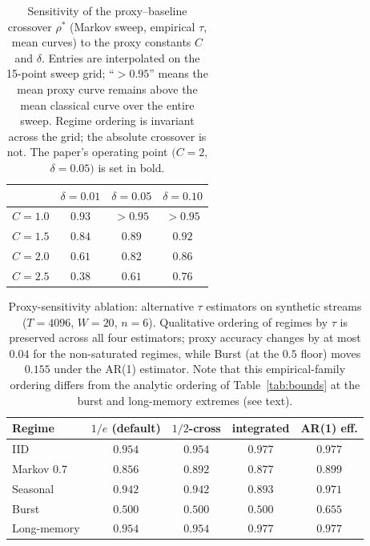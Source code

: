 \documentclass[sensors,article,submit,pdftex,moreauthors]{Definitions/mdpi}
\begin{document}
\begin{table}[t]
\centering
\caption{Sensitivity of the proxy--baseline crossover $\rho^{*}$ (Markov sweep, empirical $\tau$, mean curves) to the proxy constants $C$ and $\delta$. Entries are interpolated on the 15-point sweep grid; ``$>0.95$'' means the mean proxy curve remains above the mean classical curve over the entire sweep. Regime ordering is invariant across the grid; the absolute crossover is not. The paper's operating point $(C = 2$, $\delta = 0.05)$ is set in bold.}
\label{tab:cdelta}
\begin{tabular}{@{}lccc@{}}
\toprule
 & $\delta = 0.01$ & $\delta = 0.05$ & $\delta = 0.10$ \\
\midrule
$C = 1.0$ & $0.93$ & $>0.95$ & $>0.95$ \\
$C = 1.5$ & $0.84$ & $0.89$ & $0.92$ \\
$C = 2.0$ & $0.61$ & $\mathbf{0.82}$ & $0.86$ \\
$C = 2.5$ & $0.38$ & $0.61$ & $0.76$ \\
\bottomrule
\end{tabular}
\end{table}

\begin{table}[t]
\centering
\caption{Proxy-sensitivity ablation: alternative $\tau$ estimators on synthetic streams ($T = 4096$, $W = 20$, $n = 6$). Qualitative ordering of regimes by $\tau$ is preserved across all four estimators; proxy accuracy changes by at most $0.04$ for the non-saturated regimes, while Burst (at the $0.5$ floor) moves $0.155$ under the AR(1) estimator. Note that this empirical-family ordering differs from the analytic ordering of Table~\ref{tab:bounds} at the burst and long-memory extremes (see text).}
\label{tab:ablations}
\begin{tabular}{@{}lcccc@{}}
\toprule
Regime & $1/e$ (default) & $1/2$-cross & integrated & AR(1) eff. \\
\midrule
IID         & $0.954$ & $0.954$ & $0.977$ & $0.977$ \\
Markov $0.7$ & $0.856$ & $0.892$ & $0.877$ & $0.899$ \\
Seasonal    & $0.942$ & $0.942$ & $0.893$ & $0.971$ \\
Burst       & $0.500$ & $0.500$ & $0.500$ & $0.655$ \\
Long-memory & $0.954$ & $0.954$ & $0.977$ & $0.977$ \\
\bottomrule
\end{tabular}
\end{table}
\end{document}
